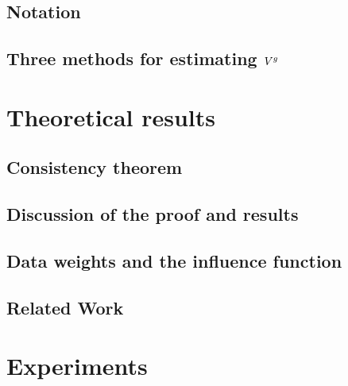 \documentclass[12pt]{article} %
\begin{document}
\subsection{Notation}


\subsection{Three methods for estimating $V^g$}



%
\section{Theoretical results}
% 



\subsection{Consistency theorem}


\subsection{Discussion of the proof and results}




\subsection{Data weights and the influence function}


\subsection{Related Work}




\section{Experiments}

\end{document}
